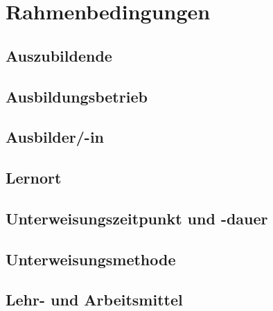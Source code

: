 \chapter{Rahmenbedingungen}

\section{Auszubildende}

\section{Ausbildungsbetrieb}

\section{Ausbilder/-in}

\section{Lernort}

\section{Unterweisungszeitpunkt und -dauer}

\section{Unterweisungsmethode}

\section{Lehr- und Arbeitsmittel}


